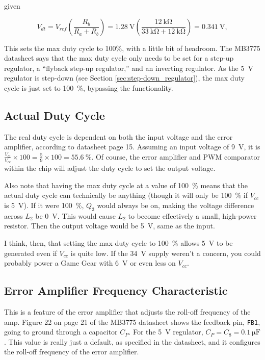 \documentclass{article}
\newcommand{\Vcc}{$V_{cc}$}
\newcommand{\chippin}{\texttt}
\newcommand{\model}{\textsf}
\begin{document}
\noindent
given

\begin{displaymath}
  V_{dt} = V_{ref}\left(\frac{R_b}{R_a+R_b}\right) =
  \qty{1.28}{\volt}\left(
  \frac{\qty{12}{\kilo\ohm}}{\qty{33}{\kilo\ohm} +
    \qty{12}{\kilo\ohm}}\right) = \qty{0.341}{\volt},
\end{displaymath}

This sets the max duty cycle to 100\%, with a little bit of
headroom. The \model{MB3775} datasheet says that the max duty cycle
only needs to be set for a step-up regulator, a ``flyback step-up
regulator,'' and an inverting regulator. As the \qty{5}{\volt}
regulator is step-down (see Section \ref{sec:step-down_regulator}),
the max duty cycle is just set to \qty{100}{\%}, bypassing the
functionality.

\subsection{Actual Duty Cycle}
The real duty cycle is dependent on both the input voltage and the
error amplifier, according to datasheet page 15. Assuming an input
voltage of \qty{9}{\volt}, it is
$\frac{V_O}{V_{cc}}\times{}100 = \frac{5}{9}\times{}100 =
\qty{55.6}{\%}$. Of course, the error amplifier and PWM comparator
within the chip will adjust the duty cycle to set the output voltage.

Also note that having the max duty cycle at a value of \qty{100}{\%}
means that the actual duty cycle can technically be anything (though
it will only be \qty{100}{\%} if \Vcc{} is \qty{5}{\volt}). If it were
\qty{100}{\%}, $Q_3$ would always be on, making the voltage difference
across $L_2$ be \qty{0}{\volt}. This would cause $L_2$ to become
effectively a small, high-power resistor. Then the output voltage
would be \qty{5}{\volt}, same as the input.

I think, then, that setting the max duty cycle to \qty{100}{\%} allows
\qty{5}{\volt} to be generated even if \Vcc{} is quite low. If the
\qty{34}{\volt} supply weren't a concern, you could probably power a
Game Gear with \qty{6}{\volt} or even less on \Vcc{}.


\subsection{Error Amplifier Frequency Characteristic}
\label{sec:5v_error_amp_char}
This is a feature of the error amplifier that adjusts the roll-off
frequency of the amp. Figure 22 on page 21 of the \model{MB3775}
datasheet shows the feedback pin, \chippin{FB1}, going to ground
through a capacitor $C_P$. For the \qty{5}{\volt} regulator,
$C_P = C_8 = \qty{0.1}{\micro\farad}$. This value is really just a
default, as specified in the datasheet, and it configures the roll-off
frequency of the error amplifier.
\end{document}
